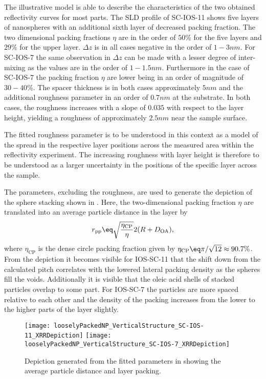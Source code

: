 \documentclass[\main/dresen_thesis.tex]{subfiles}
\begin{document}
  The illustrative model is able to describe the characteristics of the two obtained reflectivity curves for most parts.
  The SLD profile of SC-IOS-11 shows five layers of nanospheres with an additional sixth layer of decreased packing fraction.
  The two dimensional packing fractions $\eta$ are in the order of $50 \unit{\%}$ for the five layers and $29 \unit{\%}$ for the upper layer.
  $\Delta z$ is in all cases negative in the order of $1 - 3 \unit{nm}$.
  For SC-IOS-7 the same observation in $\Delta z$ can be made with a lesser degree of inter-mixing as the values are in the order of $1 - 1.5 \unit{nm}$.
  Furthermore in the case of SC-IOS-7 the packing fraction $\eta$ are lower being in an order of magnitude of $30 - 40 \unit{\%}$.
  The spacer thickness is in both cases approximately $5 \unit{nm}$ and the additional roughness parameter in an order of $0.7 \unit{nm}$ at the substrate.
  In both cases, the roughness increases with a slope of $0.035$ with respect to the layer height, yielding a roughness of approximately $2.5 \unit{nm}$ near the sample surface.

  The fitted roughness parameter is to be understood in this context as a model of the spread in the respective layer positions across the measured area within the reflectivity experiment.
  The increasing roughness with layer height is therefore to be understood as a larger uncertainty in the positions of the specific layer across the sample.

  The parameters, excluding the roughness, are used to generate the depiction of the sphere stacking shown in .
  Here, the two-dimensional packing fraction $\eta$ are translated into an average particle distance in the layer by
  \begin{align}
    r_\mathrm{pp} \eq \sqrt{\frac{\eta_\mathrm{CP}}{\eta}} 2 (R + D_\mathrm{OA}),
  \end{align}
  where $\eta_\mathrm{CP}$ is the dense circle packing fraction given by $\eta_\mathrm{CP} \eq \pi / \sqrt{12} \approx 90.7 \%$.
  From the depiction it becomes visible for IOS-SC-11 that the shift down from the calculated pitch correlates with the lowered lateral packing density as the spheres fill the voids.
  Additionally it is visible that the oleic acid shells of stacked particles overlap to some part.
  For IOS-SC-7 the particles are more spaced relative to each other and the density of the packing increases from the lower to the higher parts of the layer slightly.

  \begin{figure}[tb]
    \centering
    \texttt{[image: looselyPackedNP\_VerticalStructure\_SC-IOS-11\_XRRDepiction]}
    \texttt{[image: looselyPackedNP\_VerticalStructure\_SC-IOS-7\_XRRDepiction]}
    \caption{\label{fig:looselyPackedNP:layer:xrrDepiction}Depiction generated from the fitted parameters in  showing the average particle distance and layer packing.}
  \end{figure}
\end{document}

